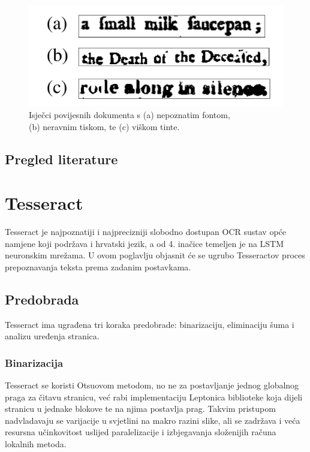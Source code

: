 \documentclass[zavrsnirad]{fer}
\begin{document}
\begin{figure}[hbt]
	\centering
	\includegraphics[width=0.6\linewidth]{Figures/historical-issues.png} 
	\caption{Isječci povijesnih dokumenta s (a) nepoznatim fontom, \\ (b) neravnim tiskom, te (c) viškom tinte. \cite{Berg2013}}
	\label{slk:historical-issues}
\end{figure}

\section{Pregled literature}

\cite{Berg2013}
\cite{Springmann2014}
\cite{Christy2017}
\cite{Wick2018}
\cite{Garrette2015}
\cite{Garrette2016}


\chapter{Tesseract}
\label{pog:tesseract}

Tesseract \cite{Smith2007} je najpoznatiji i najprecizniji slobodno dostupan OCR sustav opće namjene koji podržava i hrvatski jezik, a od 4. inačice temeljen je na LSTM neuronskim mrežama. U ovom poglavlju objasnit će se ugrubo Tesseractov proces prepoznavanja teksta prema zadanim postavkama.

\section{Predobrada}

Tesseract ima ugrađena tri koraka predobrade: binarizaciju, eliminaciju šuma i analizu uređenja stranica.

\subsection{Binarizacija}

Tesseract se koristi Otsuovom metodom, no ne za postavljanje jednog globalnog praga za čitavu stranicu, već rabi implementaciju Leptonica biblioteke \cite{Leptonica} koja dijeli stranicu u jednake blokove te na njima postavlja prag. Takvim pristupom nadvladavaju se varijacije u svjetlini na makro razini slike, ali se zadržava i veća resursna učinkovitost uslijed paralelizacije i izbjegavanja složenijih računa lokalnih metoda.
\end{document}
